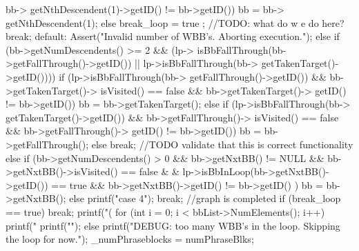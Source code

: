 \begin{DoxyCode}
{{{{{{                                                                 bb->
      getNthDescendent(1)->getID() != bb->getID())
                                                                bb = bb->
      getNthDescendent(1);
                                                        else
                                                                break_loop = true
      ;
                                                                //TODO: what do w
      e do here?
                                                        break;
                                                default:
                                                        Assert("Invalid number of
       WBB's. Aborting execution.");
                                        }
                                } else if (bb->getNumDescendents() >= 2 && (lp->
      isBbFallThrough(bb->getFallThrough()->getID()) || lp->isBbFallThrough(bb->
      getTakenTarget()->getID()))) {
                                        if (lp->isBbFallThrough(bb->
      getFallThrough()->getID()) &&
                                                           bb->getTakenTarget()->
      isVisited() == false &&
                                                           bb->getTakenTarget()->
      getID() != bb->getID()) {
                                                bb = bb->getTakenTarget();
                                        } else if (lp->isBbFallThrough(bb->
      getTakenTarget()->getID()) &&
                                                           bb->getFallThrough()->
      isVisited() == false &&
                                                           bb->getFallThrough()->
      getID() != bb->getID()) {
                                                bb = bb->getFallThrough();
                                        } else {
                                                break; //TODO validate that this 
      is correct functionality
                                        }
                                } else if (bb->getNumDescendents() > 0 &&
                                                   bb->getNxtBB() != NULL &&
                                           bb->getNxtBB()->isVisited() == false &
      & 
                                                   lp->isBbInLoop(bb->getNxtBB()-
      >getID()) == true &&
                                           bb->getNxtBB()->getID() != bb->getID()
      ) {
                                        bb = bb->getNxtBB();
                                } else {
                                        printf("case 4\n");
                                        break; //graph is completed
                                }
                                if (break_loop == true) break;
                        }
                        printf("\nPHRASE (%
                        for (int i = 0; i < bbList->NumElements(); i++) {
                                printf("%
                        }
                        printf("\n");
                }
        } else {
                printf("DEBUG: too many WBB's in the loop. Skipping the loop for 
      now.\n");
        }
        _numPhraseblocks = numPhraseBlks;
}
\end{DoxyCode}


